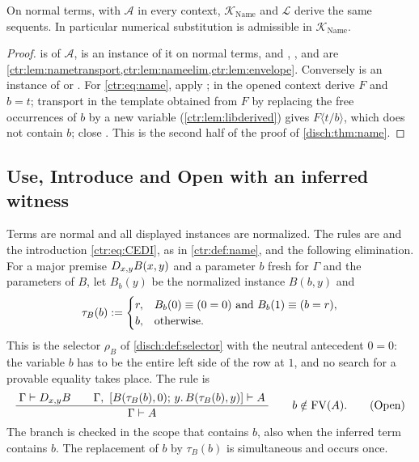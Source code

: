 \begin{theorem}\label{ctr:thm:nameequiv}
On normal terms, with $\mathcal A$ in every context, $\mathcal K_{\mathrm{Name}}$ and
$\mathcal L$ derive the same sequents. In particular numerical substitution is admissible in
$\mathcal K_{\mathrm{Name}}$.
\end{theorem}
\begin{proof}
 is  of $\mathcal A$,  is an instance of it on
normal terms, and , ,  and  are
\cref{ctr:lem:nametransport,ctr:lem:nameelim,ctr:lem:envelope}. Conversely 
is an instance of  or . For \eqref{ctr:eq:name}, apply
; in the opened context derive $F$ and $b=t$; transport in the template
obtained from $F$ by replacing the free occurrences of $b$ by a new variable
(\cref{ctr:lem:libderived}) gives $F\langle t/b\rangle$, which does not contain $b$; close
. This is the second half of the proof of \cref{disch:thm:name}.
\end{proof}

\subsection{Use, Introduce and Open with an inferred witness}

\begin{definition}\label{ctr:def:open}
Terms are normal and all displayed instances are normalized. The rules are 
and the introduction \eqref{ctr:eq:CEDI}, as in \cref{ctr:def:name}, and the following
elimination. For a major premise $D_{x,y}B(x,y)$ and a parameter $b$ fresh for $\Gamma$
and the parameters of $B$, let $B_b(y)$ be the normalized instance $B(b,y)$ and
\begin{equation}\label{ctr:eq:probe}
 \tau_B(b)\mathrel{:=}
 \begin{cases}
  r, & B_b(0)\equiv(0=0) \text{ and } B_b(1)\equiv(b=r),\\
  b, & \text{otherwise.}
 \end{cases}
\end{equation}
This is the selector $\rho_B$ of \cref{disch:def:selector} with the neutral antecedent
$0=0$: the variable $b$ has to be the entire left side of the row at $1$, and no search for
a provable equality takes place. The rule is
\begin{equation}\label{ctr:eq:open}
 \dfrac{\;\Gamma\vdash D_{x,y}B\qquad
          \Gamma,\ [B(\tau_B(b),0);\,y.\,B(\tau_B(b),y)]\vdash A\;}{\;\Gamma\vdash A\;}
 \qquad b\notin\operatorname{FV}(A).\tag{Open}
\end{equation}
The branch is checked in the scope that contains $b$, also when the inferred term contains
$b$. The replacement of $b$ by $\tau_B(b)$ is simultaneous and occurs once.
\end{definition}

